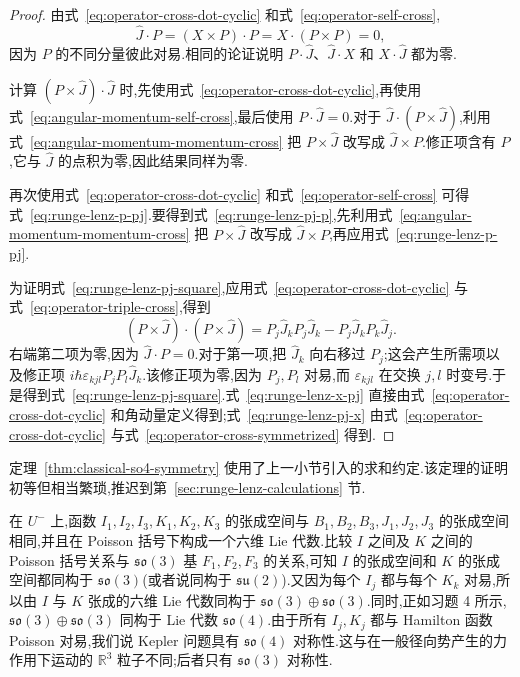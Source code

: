 {\begin{proof}
由式~\eqref{eq:operator-cross-dot-cyclic} 和式~\eqref{eq:operator-self-cross},
\[
 \widehat J\cdot P=(X\times P)\cdot P=X\cdot(P\times P)=0,
\]
因为 $P$ 的不同分量彼此对易.相同的论证说明 $P\cdot\widehat J$、$\widehat J\cdot X$ 和 $X\cdot\widehat J$ 都为零.

计算 $(P\times\widehat J)\cdot\widehat J$ 时,先使用式~\eqref{eq:operator-cross-dot-cyclic},再使用式~\eqref{eq:angular-momentum-self-cross},最后使用 $P\cdot\widehat J=0$.对于 $\widehat J\cdot(P\times\widehat J)$,利用式~\eqref{eq:angular-momentum-momentum-cross} 把 $P\times\widehat J$ 改写成 $\widehat J\times P$.修正项含有 $P$,它与 $\widehat J$ 的点积为零,因此结果同样为零.

再次使用式~\eqref{eq:operator-cross-dot-cyclic} 和式~\eqref{eq:operator-self-cross} 可得式~\eqref{eq:runge-lenz-p-pj}.要得到式~\eqref{eq:runge-lenz-pj-p},先利用式~\eqref{eq:angular-momentum-momentum-cross} 把 $P\times\widehat J$ 改写成 $\widehat J\times P$,再应用式~\eqref{eq:runge-lenz-p-pj}.

为证明式~\eqref{eq:runge-lenz-pj-square},应用式~\eqref{eq:operator-cross-dot-cyclic} 与式~\eqref{eq:operator-triple-cross},得到
\[
 (P\times\widehat J)\cdot(P\times\widehat J)
 =P_j\widehat J_kP_j\widehat J_k-P_j\widehat J_kP_k\widehat J_j.
\label{eq:runge-lenz-pj-square-expanded}
\]
右端第二项为零,因为 $\widehat J\cdot P=0$.对于第一项,把 $\widehat J_k$ 向右移过 $P_j$;这会产生所需项以及修正项 $i\hbar\varepsilon_{kjl}P_jP_l\widehat J_k$.该修正项为零,因为 $P_j,P_l$ 对易,而 $\varepsilon_{kjl}$ 在交换 $j,l$ 时变号.于是得到式~\eqref{eq:runge-lenz-pj-square}.式~\eqref{eq:runge-lenz-x-pj} 直接由式~\eqref{eq:operator-cross-dot-cyclic} 和角动量定义得到;式~\eqref{eq:runge-lenz-pj-x} 由式~\eqref{eq:operator-cross-dot-cyclic} 与式~\eqref{eq:operator-cross-symmetrized} 得到.
\end{proof}

定理~\ref{thm:classical-so4-symmetry} 使用了上一小节引入的求和约定.该定理的证明初等但相当繁琐,推迟到第~\ref{sec:runge-lenz-calculations} 节.

在 $U^-$ 上,函数 $I_1,I_2,I_3,K_1,K_2,K_3$ 的张成空间与 $B_1,B_2,B_3,J_1,J_2,J_3$ 的张成空间相同,并且在 Poisson 括号下构成一个六维 Lie 代数.比较 $I$ 之间及 $K$ 之间的 Poisson 括号关系与 $\mathfrak{so}(3)$ 基 $F_1,F_2,F_3$ 的关系,可知 $I$ 的张成空间和 $K$ 的张成空间都同构于 $\mathfrak{so}(3)$(或者说同构于 $\mathfrak{su}(2)$).又因为每个 $I_j$ 都与每个 $K_k$ 对易,所以由 $I$ 与 $K$ 张成的六维 Lie 代数同构于 $\mathfrak{so}(3)\oplus\mathfrak{so}(3)$.同时,正如习题 4 所示,$\mathfrak{so}(3)\oplus\mathfrak{so}(3)$ 同构于 Lie 代数 $\mathfrak{so}(4)$.由于所有 $I_j,K_j$ 都与 Hamilton 函数 Poisson 对易,我们说 Kepler 问题具有 $\mathfrak{so}(4)$ 对称性.这与在一般径向势产生的力作用下运动的 $\mathbb R^3$ 粒子不同;后者只有 $\mathfrak{so}(3)$ 对称性.

}
